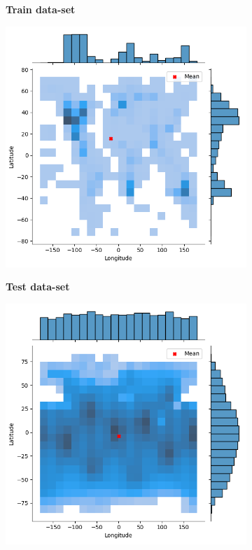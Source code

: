 \begin{figure}[hbt!]
\centering

\begin{subfigure}{.32\linewidth}
\vspace*{-1ex}  
\begin{center}
\textbf{Train data-set}
\end{center}
\vspace*{-1ex}
  \includegraphics[width=\linewidth]{Images/hist_train.png}
\end{subfigure} %
\begin{subfigure}{.32\linewidth}
\vspace*{-1ex}  
\begin{center}
\textbf{Test data-set}
\end{center}
\vspace*{-1ex}
  \includegraphics[width=\linewidth]{Images/hist_test.png}

\end{subfigure}
\end{figure}
